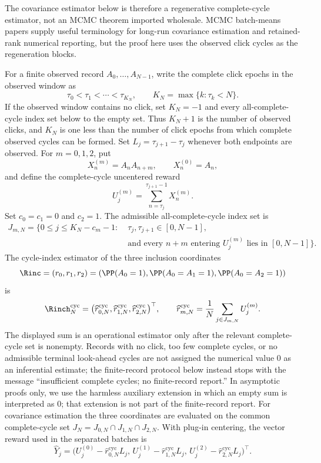 The covariance estimator below is therefore a regenerative complete-cycle
estimator, not an MCMC theorem imported wholesale.  MCMC batch-means papers
supply useful terminology for long-run covariance estimation and retained-rank
numerical reporting, but the proof here uses the observed click cycles as the
regeneration blocks.

\begin{definition}\label{def:cycle-index-inclusion-estimator-main}
For a finite observed record \(A_0,\ldots,A_{N-1}\), write the complete click
epochs in the observed window as
\[
\tau_0<\tau_1<\cdots<\tau_{K_N},\qquad K_N=\max\{k:\tau_k<N\}.
\]
If the observed window contains no click, set \(K_N=-1\) and every
all-complete-cycle index set below to the empty set.  Thus \(K_N+1\) is the
number of observed clicks, and \(K_N\) is one less than the number of click
epochs from which complete observed cycles can be formed.  Set
\(L_j=\tau_{j+1}-\tau_j\) whenever both endpoints are observed.  For
\(m=0,1,2\), put
\[
X_n^{(m)}=A_nA_{n+m},\qquad X_n^{(0)}=A_n,
\]
and define the complete-cycle uncentered reward
\[
U_j^{(m)}=\sum_{n=\tau_j}^{\tau_{j+1}-1}X_n^{(m)}.
\]
Set \(c_0=c_1=0\) and \(c_2=1\).  The admissible all-complete-cycle index set is
\[
\begin{aligned}
J_{m,N}
=\{0\le j\le K_N-c_m-1:\;&
\tau_j,\tau_{j+1}\in[0,N-1],\\
&\text{and every }n+m\text{ entering }U_j^{(m)}
\text{ lies in }[0,N-1]\}.
\end{aligned}
\]
The cycle-index estimator of the three inclusion coordinates
\[
\Rinc=(r_0,r_1,r_2)=(\PP(A_0=1),\PP(A_0=A_1=1),\PP(A_0=A_2=1))
\]
is
\[
\Rinch_N^{\mathrm{cyc}}
=\bigl(\widehat r_{0,N}^{\mathrm{cyc}},
\widehat r_{1,N}^{\mathrm{cyc}},
\widehat r_{2,N}^{\mathrm{cyc}}\bigr)^\top,\qquad
\widehat r_{m,N}^{\mathrm{cyc}}
=\frac1N\sum_{j\in J_{m,N}}U_j^{(m)} .
\]
The displayed sum is an operational estimator only after the relevant
complete-cycle set is nonempty.  Records with no click, too few complete
cycles, or no admissible terminal look-ahead cycles are not assigned the
numerical value \(0\) as an inferential estimate; the finite-record protocol
below instead stops with the message ``insufficient complete cycles; no
finite-record report.''  In asymptotic proofs only, we use the harmless auxiliary
extension in which an empty sum is interpreted as \(0\); that extension is not
part of the finite-record report.
For covariance estimation the three coordinates are evaluated on the common
complete-cycle set \(J_N=J_{0,N}\cap J_{1,N}\cap J_{2,N}\).  With plug-in
centering, the vector reward used in the separated batches is
\[
\widehat Y_j=
\bigl(U_j^{(0)}-\widehat r_{0,N}^{\mathrm{cyc}}L_j,\,
U_j^{(1)}-\widehat r_{1,N}^{\mathrm{cyc}}L_j,\,
U_j^{(2)}-\widehat r_{2,N}^{\mathrm{cyc}}L_j\bigr)^\top .
\]
\end{definition}

